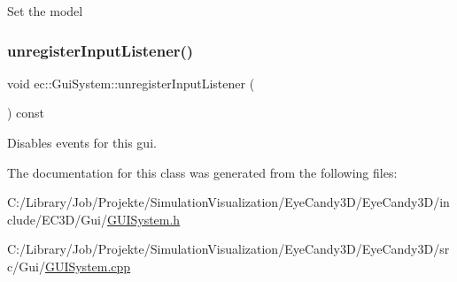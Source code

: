 Set the model \mbox{\label{classec_1_1_gui_system_a18d7d063334763b264da1392199f4c4e}} 
\subsubsection{\texorpdfstring{unregister\+Input\+Listener()}{unregisterInputListener()}}
{\footnotesize\ttfamily void ec\+::\+Gui\+System\+::unregister\+Input\+Listener (\begin{DoxyParamCaption}{ }\end{DoxyParamCaption}) const}

Disables events for this gui. 

The documentation for this class was generated from the following files\+:\begin{DoxyCompactItemize}
\item 
C\+:/\+Library/\+Job/\+Projekte/\+Simulation\+Visualization/\+Eye\+Candy3\+D/\+Eye\+Candy3\+D/include/\+E\+C3\+D/\+Gui/\mbox{\hyperlink{_g_u_i_system_8h}{G\+U\+I\+System.\+h}}\item 
C\+:/\+Library/\+Job/\+Projekte/\+Simulation\+Visualization/\+Eye\+Candy3\+D/\+Eye\+Candy3\+D/src/\+Gui/\mbox{\hyperlink{_g_u_i_system_8cpp}{G\+U\+I\+System.\+cpp}}\end{DoxyCompactItemize}
